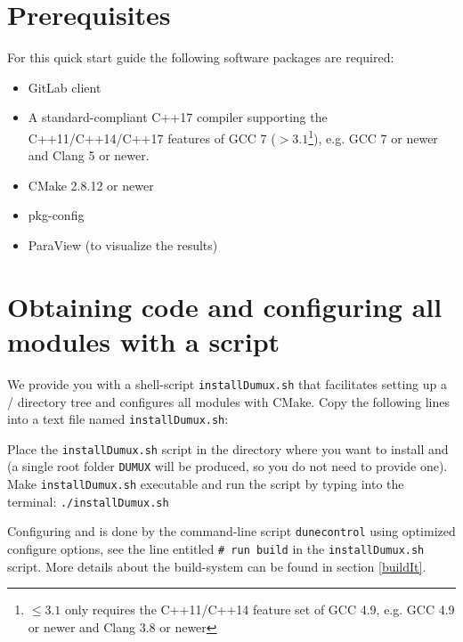 \section{Prerequisites} \label{sec:prerequisites}
For this quick start guide the following software packages are required:
\begin{itemize}
\item GitLab client
\item A standard-compliant C++17 compiler supporting the C++11/C++14/C++17 features of GCC 7
(\Dumux $> 3.1$\footnote{\Dumux $\leq 3.1$ only requires the C++11/C++14 feature set of GCC 4.9, e.g. GCC 4.9 or newer and Clang 3.8 or newer}),
e.g. GCC 7 or newer and Clang 5 or newer.
\item CMake 2.8.12 or newer
\item pkg-config
\item ParaView (to visualize the results)
\end{itemize}

\section{Obtaining code and configuring all modules with a script}
We provide you with a shell-script \texttt{installDumux.sh} that facilitates setting up a {\Dune}/{\Dumux} directory tree
and configures all modules with CMake.
Copy the following lines into a text file named \texttt{installDumux.sh}:


Place the \texttt{installDumux.sh} script in the directory where you want to install \Dumux and \Dune (a single
root folder \texttt{DUMUX} will be produced, so you do not need to provide one). Make \texttt{installDumux.sh} executable and run the script by typing into the terminal: \texttt{./installDumux.sh}

Configuring \Dune and \Dumux is done by the command-line script \texttt{dunecontrol}
using optimized configure options, see the line entitled \texttt{\# run build} in the \texttt{installDumux.sh} script.
More details about the build-system can be found in section \ref{buildIt}.

